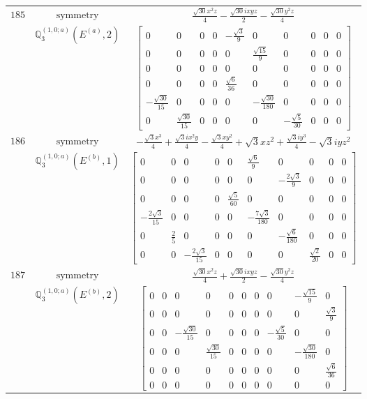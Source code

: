 \documentclass[fleqn,8pt,landscape]{jsarticle}
\begin{document}
\begin{longtable}{ccc}
$ 185 $ & $ \text{symmetry} $ & $ \frac{\sqrt{30} x^{2} z}{4} - \frac{\sqrt{30} i x y z}{2} - \frac{\sqrt{30} y^{2} z}{4} $ \\
$  $ & $ \mathbb{Q}_{3}^{(1,0;a)}(E^{(a)},2) $ & $ \begin{bmatrix} 0 & 0 & 0 & 0 & - \frac{\sqrt{3}}{9} & 0 & 0 & 0 & 0 & 0 \\ 0 & 0 & 0 & 0 & 0 & \frac{\sqrt{15}}{9} & 0 & 0 & 0 & 0 \\ 0 & 0 & 0 & 0 & 0 & 0 & 0 & 0 & 0 & 0 \\ 0 & 0 & 0 & 0 & \frac{\sqrt{6}}{36} & 0 & 0 & 0 & 0 & 0 \\ - \frac{\sqrt{30}}{15} & 0 & 0 & 0 & 0 & - \frac{\sqrt{30}}{180} & 0 & 0 & 0 & 0 \\ 0 & \frac{\sqrt{30}}{15} & 0 & 0 & 0 & 0 & - \frac{\sqrt{5}}{30} & 0 & 0 & 0 \end{bmatrix} $ \\ \hline
$ 186 $ & $ \text{symmetry} $ & $ - \frac{\sqrt{3} x^{3}}{4} + \frac{\sqrt{3} i x^{2} y}{4} - \frac{\sqrt{3} x y^{2}}{4} + \sqrt{3} x z^{2} + \frac{\sqrt{3} i y^{3}}{4} - \sqrt{3} i y z^{2} $ \\
$  $ & $ \mathbb{Q}_{3}^{(1,0;a)}(E^{(b)},1) $ & $ \begin{bmatrix} 0 & 0 & 0 & 0 & 0 & \frac{\sqrt{6}}{9} & 0 & 0 & 0 & 0 \\ 0 & 0 & 0 & 0 & 0 & 0 & - \frac{2 \sqrt{3}}{9} & 0 & 0 & 0 \\ 0 & 0 & 0 & 0 & \frac{\sqrt{5}}{60} & 0 & 0 & 0 & 0 & 0 \\ - \frac{2 \sqrt{3}}{15} & 0 & 0 & 0 & 0 & - \frac{7 \sqrt{3}}{180} & 0 & 0 & 0 & 0 \\ 0 & \frac{2}{5} & 0 & 0 & 0 & 0 & - \frac{\sqrt{6}}{180} & 0 & 0 & 0 \\ 0 & 0 & - \frac{2 \sqrt{3}}{15} & 0 & 0 & 0 & 0 & \frac{\sqrt{2}}{20} & 0 & 0 \end{bmatrix} $ \\ \hline
$ 187 $ & $ \text{symmetry} $ & $ \frac{\sqrt{30} x^{2} z}{4} + \frac{\sqrt{30} i x y z}{2} - \frac{\sqrt{30} y^{2} z}{4} $ \\
$  $ & $ \mathbb{Q}_{3}^{(1,0;a)}(E^{(b)},2) $ & $ \begin{bmatrix} 0 & 0 & 0 & 0 & 0 & 0 & 0 & 0 & - \frac{\sqrt{15}}{9} & 0 \\ 0 & 0 & 0 & 0 & 0 & 0 & 0 & 0 & 0 & \frac{\sqrt{3}}{9} \\ 0 & 0 & - \frac{\sqrt{30}}{15} & 0 & 0 & 0 & 0 & - \frac{\sqrt{5}}{30} & 0 & 0 \\ 0 & 0 & 0 & \frac{\sqrt{30}}{15} & 0 & 0 & 0 & 0 & - \frac{\sqrt{30}}{180} & 0 \\ 0 & 0 & 0 & 0 & 0 & 0 & 0 & 0 & 0 & \frac{\sqrt{6}}{36} \\ 0 & 0 & 0 & 0 & 0 & 0 & 0 & 0 & 0 & 0 \end{bmatrix} $ \\ \hline

\end{longtable}
\end{document}
